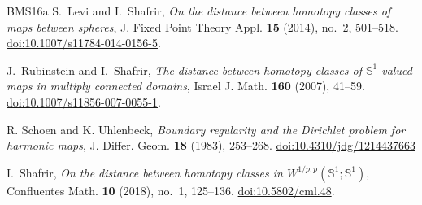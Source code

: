 \documentclass[11pt,reqno]{amsart}
\numberwithin{equation}{section}
\begin{document}
\begin{thebibliography}{BMS16a}
S.~Levi and I.~Shafrir,
\emph{On the distance between homotopy classes of maps between spheres},
J. Fixed Point Theory Appl. \textbf{15} (2014), no.~2, 501--518.
\href{https://doi.org/10.1007/s11784-014-0156-5}{doi:10.1007/s11784-014-0156-5}.

J.~Rubinstein and I.~Shafrir,
\emph{The distance between homotopy classes of $\mathbb S^1$-valued maps in multiply connected domains},
Israel J. Math. \textbf{160} (2007), 41--59.
\href{https://doi.org/10.1007/s11856-007-0055-1}{doi:10.1007/s11856-007-0055-1}.

R. Schoen and K. Uhlenbeck, 
\emph{Boundary regularity and the Dirichlet problem for harmonic maps}, J. Diﬀer. Geom. \textbf{18} (1983), 253--268.
\href{https://doi.org/10.4310/jdg/1214437663}{doi:10.4310/jdg/1214437663}

I.~Shafrir,
\emph{On the distance between homotopy classes in $W^{1/p,p}(\mathbb S^1;\mathbb S^1)$},
Confluentes Math. \textbf{10} (2018), no.~1, 125--136.
\href{https://doi.org/10.5802/cml.48}{doi:10.5802/cml.48}.

\end{thebibliography}
\end{document}
